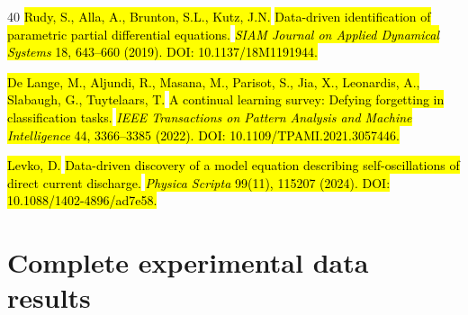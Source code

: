 \documentclass[preprint,12pt]{elsarticle}
\newcommand{\rev}[1]{\hl{#1}}
\begin{document}
\begin{thebibliography}{40}
\rev{Rudy, S., Alla, A., Brunton, S.L., Kutz, J.N.}
\rev{Data-driven identification of parametric partial differential equations.}
\rev{\textit{SIAM Journal on Applied Dynamical Systems} 18, 643--660 (2019). DOI: 10.1137/18M1191944.}

\rev{De Lange, M., Aljundi, R., Masana, M., Parisot, S., Jia, X., Leonardis, A., Slabaugh, G., Tuytelaars, T.}
\rev{A continual learning survey: Defying forgetting in classification tasks.}
\rev{\textit{IEEE Transactions on Pattern Analysis and Machine Intelligence} 44, 3366--3385 (2022). DOI: 10.1109/TPAMI.2021.3057446.}

\rev{Levko, D.}
\rev{Data-driven discovery of a model equation describing self-oscillations of direct current discharge.}
\rev{\textit{Physica Scripta} 99(11), 115207 (2024). DOI: 10.1088/1402-4896/ad7e58.}

\end{thebibliography}









































\clearpage %
\appendix
\setcounter{table}{0}
\section{Complete experimental data results}
\label{Complete experimental results}
\end{document}
